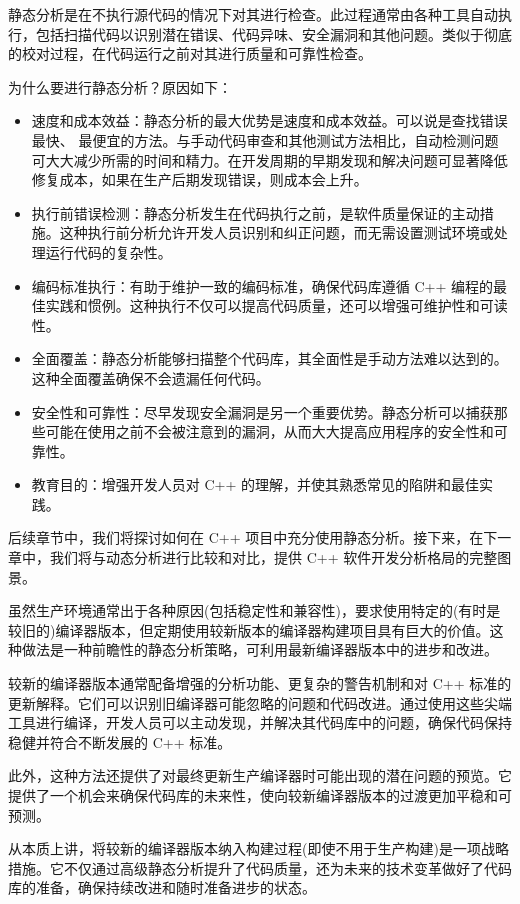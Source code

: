 
静态分析是在不执行源代码的情况下对其进行检查。此过程通常由各种工具自动执行，包括扫描代码以识别潜在错误、代码异味、安全漏洞和其他问题。类似于彻底的校对过程，在代码运行之前对其进行质量和可靠性检查。

为什么要进行静态分析？原因如下：

\begin{itemize}
\item
速度和成本效益：静态分析的最大优势是速度和成本效益。可以说是查找错误最快、 最便宜的方法。与手动代码审查和其他测试方法相比，自动检测问题可大大减少所需的时间和精力。在开发周期的早期发现和解决问题可显著降低修复成本，如果在生产后期发现错误，则成本会上升。

\item
执行前错误检测：静态分析发生在代码执行之前，是软件质量保证的主动措施。这种执行前分析允许开发人员识别和纠正问题，而无需设置测试环境或处理运行代码的复杂性。

\item
编码标准执行：有助于维护一致的编码标准，确保代码库遵循 C++ 编程的最佳实践和惯例。这种执行不仅可以提高代码质量，还可以增强可维护性和可读性。

\item
全面覆盖：静态分析能够扫描整个代码库，其全面性是手动方法难以达到的。这种全面覆盖确保不会遗漏任何代码。

\item
安全性和可靠性：尽早发现安全漏洞是另一个重要优势。静态分析可以捕获那些可能在使用之前不会被注意到的漏洞，从而大大提高应用程序的安全性和可靠性。

\item
教育目的：增强开发人员对 C++ 的理解，并使其熟悉常见的陷阱和最佳实践。
\end{itemize}

后续章节中，我们将探讨如何在 C++ 项目中充分使用静态分析。接下来，在下一章中，我们将与动态分析进行比较和对比，提供 C++ 软件开发分析格局的完整图景。


虽然生产环境通常出于各种原因(包括稳定性和兼容性)，要求使用特定的(有时是较旧的)编译器版本，但定期使用较新版本的编译器构建项目具有巨大的价值。这种做法是一种前瞻性的静态分析策略，可利用最新编译器版本中的进步和改进。

较新的编译器版本通常配备增强的分析功能、更复杂的警告机制和对 C++ 标准的更新解释。它们可以识别旧编译器可能忽略的问题和代码改进。通过使用这些尖端工具进行编译，开发人员可以主动发现，并解决其代码库中的问题，确保代码保持稳健并符合不断发展的 C++ 标准。

此外，这种方法还提供了对最终更新生产编译器时可能出现的潜在问题的预览。它提供了一个机会来确保代码库的未来性，使向较新编译器版本的过渡更加平稳和可预测。

从本质上讲，将较新的编译器版本纳入构建过程(即使不用于生产构建)是一项战略措施。它不仅通过高级静态分析提升了代码质量，还为未来的技术变革做好了代码库的准备，确保持续改进和随时准备进步的状态。


















